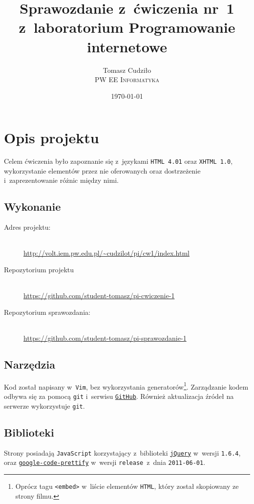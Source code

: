 \documentclass[10pt,a4paper]{article}
\newcommand{\f}[1]{\texttt{#1}}
\begin{document}
\title{
  Sprawozdanie z~ćwiczenia nr~1\\z~laboratorium Programowanie internetowe
}
\author{
  Tomasz Cudziło\\
  \textsc{PW EE Informatyka}\\[10pt]
}
\date{\today}
\maketitle



\section{Opis projektu}
Celem ćwiczenia było zapoznanie się z~językami \f{HTML 4.01} oraz \f{XHTML 1.0},
wykorzystanie elementów przez nie oferowanych oraz dostrzeżenie
i~zaprezentowanie różnic między nimi.

\subsection{Wykonanie}
\begin{description}
  \item[Adres projektu:] \hfill \\
  \url{http://volt.iem.pw.edu.pl/~cudzilot/pi/cw1/index.html}
  \item[Repozytorium projektu] \hfill \\
  \url{https://github.com/student-tomasz/pi-cwiczenie-1}
  \item[Repozytorium sprawozdania:] \hfill \\
  \url{https://github.com/student-tomasz/pi-sprawozdanie-1}
\end{description}

\subsection{Narzędzia}
Kod został napisany w~\f{Vim}, bez wykorzystania generatorów\footnote{Oprócz
tagu \f{<embed>} w~liście elementów \f{HTML}, który został skopiowany ze strony
filmu.}. Zarządzanie kodem odbywa się za pomocą \f{git} i~serwisu
\f{\href{https://github.com/}{GitHub}}. Również aktualizacja źródeł na serwerze
wykorzystuje \f{git}.

\subsection{Biblioteki}
Strony posiadają \f{JavaScript} korzystający z~biblioteki
\f{\href{http://jquery.com/}{jQuery}} w~wersji \f{1.6.4}, oraz
\f{\href{http://code.google.com/p/google-code-prettify/}{google-code-prettify}}
w~wersji \f{release}~z~dnia \f{2011-06-01}.
\end{document}
